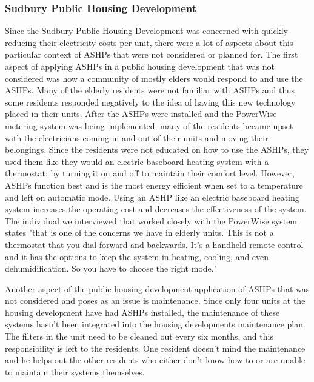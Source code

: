 \subsubsection{Sudbury Public Housing Development}
\par Since the Sudbury Public Housing Development was concerned with quickly reducing their electricity costs per unit, there were a lot of aspects about this particular context of ASHPs that were not considered or planned for. The first aspect of applying ASHPs in a public housing development that was not considered was how a community of mostly elders would respond to and use the ASHPs. Many of the elderly residents were not familiar with ASHPs and thus some residents responded negatively to the idea of having this new technology placed in their units. After the ASHPs were installed and the PowerWise metering system was being implemented, many of the residents became upset with the electricians coming in and out of their units and moving their belongings. Since the residents were not educated on how to use the ASHPs, they used them like they would an electric baseboard heating system with a thermostat: by turning it on and off to maintain their comfort level. However, ASHPs function best and is the most energy efficient when set to a temperature and left on automatic mode. Using an ASHP like an electric baseboard heating system increases the operating cost and decreases the effectiveness of the system. The individual we interviewed that worked closely with the PowerWise system states "that is one of the concerns we have in elderly units. This is not a thermostat that you dial forward and backwards. It's a handheld remote control and it has the options to keep the system in heating, cooling, and even dehumidification. So you have to choose the right mode."
\par Another aspect of the public housing development application of ASHPs that was not considered and poses as an issue is maintenance. Since only four units at the housing development have had ASHPs installed, the maintenance of these systems hasn't been integrated into the housing developments maintenance plan. The filters in the unit need to be cleaned out every six months, and this responsibility is left to the residents. One resident doesn't mind the maintenance and he helps out the other residents who either don't know how to or are unable to maintain their systems themselves.

